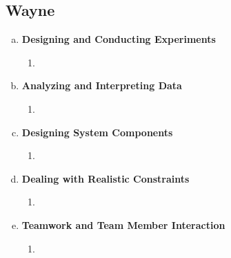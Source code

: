 \documentclass[11pt]{article}   %
\begin{document}
\subsection*{Wayne}

\begin{enumerate} [a)]
\item  {\bf Designing and Conducting Experiments}
\begin{enumerate} [$\cdot$]
\item 
\end{enumerate}
\item  {\bf Analyzing and Interpreting Data}
\begin{enumerate} [$\cdot$]
\item  
\end{enumerate}
\item {\bf Designing System Components}
\begin{enumerate} [$\cdot$]
\item 
\end{enumerate}
\item {\bf Dealing with Realistic Constraints}
\begin{enumerate} [$\cdot$]
\item 
\end{enumerate}
\item  {\bf Teamwork and Team Member Interaction}
\begin{enumerate} [$\cdot$]
\item 
\end{enumerate}
\end{enumerate}









\end{document}
